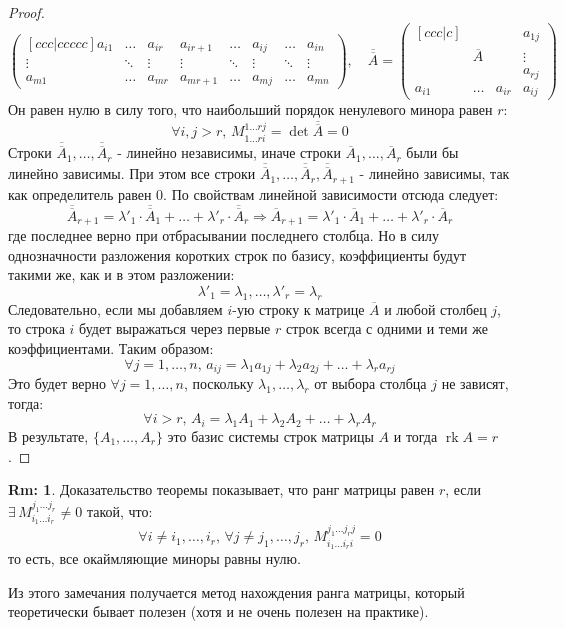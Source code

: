 \documentclass[12pt]{article}
\theoremstyle{definition}
\newtheorem{rem}{Rm:}
\DeclareMathOperator{\rk}{\text{rk}}
\begin{document}
\begin{proof}
$$\begin{pmatrix}[ccc|ccccc]
			a_{i1} & \dotsc & a_{i r} & a_{i r+1} & \dotsc & a_{i j}& \dotsc & a_{in}	\\
			\vdots & \ddots & \vdots & \vdots & \ddots & \vdots & \ddots& \vdots \\
			a_{m1} & \dotsc & a_{m r} & a_{m r+1} & \dotsc & a_{m j}& \dotsc & a_{mn}			 
		\end{pmatrix}, \quad \overline{\overline{A}} = 
		\begin{pmatrix}[ccc|c]
			& & & a_{1 j} \\
			& \overline{A} & & \vdots \\
			& & & a_{r j} \\ \hline
			a_{i1} & \dotsc & a_{ir} & a_{ij}
		\end{pmatrix}
	$$
	Он равен нулю в силу того, что наибольший порядок ненулевого минора равен $r$:
	$$
		\forall i,j > r, \, M_{1\dotsc r i}^{1\dotsc r j} = \det{\overline{\overline{A}}} = 0
	$$
	Строки $\overline{\overline{A}}_1, \dotsc, \overline{\overline{A}}_r$ - линейно независимы, иначе строки $\overline{A}_1, \dotsc, \overline{A}_r$ были бы линейно зависимы. При этом все строки $\overline{\overline{A}}_1, \dotsc, \overline{\overline{A}}_r, \overline{\overline{A}}_{r+1}$ - линейно зависимы, так как определитель равен $0$. По свойствам линейной зависимости отсюда следует:
	$$
		\overline{\overline{A}}_{r+1} = \lambda'_1{\cdot}\overline{\overline{A}}_{1} + \dotsc + \lambda'_r{\cdot}\overline{\overline{A}}_{r} \Rightarrow  \overline{A}_{r+1} = \lambda'_1{\cdot}\overline{A}_{1} + \dotsc + \lambda'_r{\cdot}\overline{A}_{r}
	$$
	где последнее верно при отбрасывании последнего столбца. Но в силу однозначности разложения коротких строк по базису, коэффициенты будут такими же, как и в этом разложении:
	$$
		\lambda'_1 = \lambda_1, \dotsc, \lambda'_r = \lambda_r
	$$
	Следовательно, если мы добавляем $i$-ую строку к матрице $\overline{A}$ и любой столбец $j$, то строка $i$ будет выражаться через первые $r$ строк всегда с одними и теми же коэффициентами. Таким образом:
	$$
		\forall j = 1,\dotsc, n, \, a_{ij} = \lambda_1 a_{1j} + \lambda_2 a_{2j} + \dotsc + \lambda_r a_{rj}
	$$
	Это будет верно $\forall j = 1,\dotsc, n$, поскольку $\lambda_1,\dotsc, \lambda_r$ от выбора столбца $j$ не зависят, тогда:
	$$
		\forall i > r, \, A_i = \lambda_1 A_1 + \lambda_2 A_2 + \dotsc + \lambda_r A_r
	$$
	В результате, $\{A_1,\dotsc, A_r\}$ это базис системы строк матрицы $A$ и тогда $\rk{A} = r$.
\end{proof}

\begin{rem}
	Доказательство теоремы показывает, что ранг матрицы равен $r$, если $\exists \, M_{i_1 \dotsc i_r}^{j_1 \dotsc j_r} \neq 0$ такой, что:
	$$
		\forall i \neq i_1, \dotsc, i_r, \, \forall j \neq j_1 ,\dotsc, j_r,\, M_{i_1 \dotsc i_r i}^{j_1 \dotsc j_r j} = 0
	$$
	то есть, все окаймляющие миноры равны нулю.
\end{rem}
Из этого замечания получается метод нахождения ранга матрицы, который теоретически бывает полезен (хотя и не очень полезен на практике).
\end{document}
